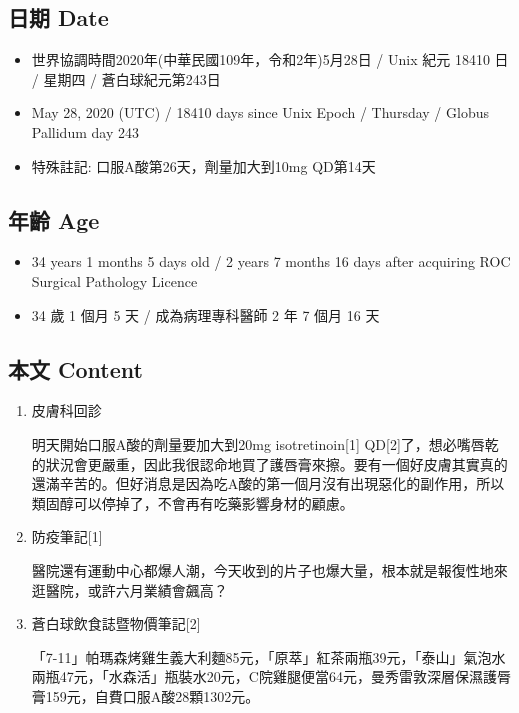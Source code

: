 \documentclass[a5paper, 11pt
]{book}
\providecommand{\tightlist}{%
  \setlength{\itemsep}{0pt}\setlength{\parskip}{0pt}}
\begin{document}
\hypertarget{ux65e5ux671f-date-88}{%
\subsection{日期 Date}\label{ux65e5ux671f-date-88}}

\begin{itemize}
\tightlist
\item
  世界協調時間2020年(中華民國109年，令和2年)5月28日 / Unix 紀元 18410 日
  / 星期四 / 蒼白球紀元第243日
\item
  May 28, 2020 (UTC) / 18410 days since Unix Epoch / Thursday / Globus
  Pallidum day 243
\item
  特殊註記: 口服A酸第26天，劑量加大到10mg QD第14天
\end{itemize}

\hypertarget{ux5e74ux9f61-age-88}{%
\subsection{年齡 Age}\label{ux5e74ux9f61-age-88}}

\begin{itemize}
\tightlist
\item
  34 years 1 months 5 days old / 2 years 7 months 16 days after
  acquiring ROC Surgical Pathology Licence
\item
  34 歲 1 個月 5 天 / 成為病理專科醫師 2 年 7 個月 16 天
\end{itemize}

\hypertarget{ux672cux6587-content-88}{%
\subsection{本文 Content}\label{ux672cux6587-content-88}}

\begin{enumerate}
\def\labelenumi{\arabic{enumi}.}
\item
  皮膚科回診

  明天開始口服A酸的劑量要加大到20mg isotretinoin{[}1{]}
  QD{[}2{]}了，想必嘴唇乾的狀況會更嚴重，因此我很認命地買了護唇膏來擦。要有一個好皮膚其實真的還滿辛苦的。但好消息是因為吃A酸的第一個月沒有出現惡化的副作用，所以類固醇可以停掉了，不會再有吃藥影響身材的顧慮。
\item
  防疫筆記{[}1{]}

  醫院還有運動中心都爆人潮，今天收到的片子也爆大量，根本就是報復性地來逛醫院，或許六月業績會飆高？
\item
  蒼白球飲食誌暨物價筆記{[}2{]}

  「7-11」帕瑪森烤雞生義大利麵85元，「原萃」紅茶兩瓶39元，「泰山」氣泡水兩瓶47元，「水森活」瓶裝水20元，C院雞腿便當64元，曼秀雷敦深層保濕護脣膏159元，自費口服A酸28顆1302元。
\end{enumerate}
\end{document}
